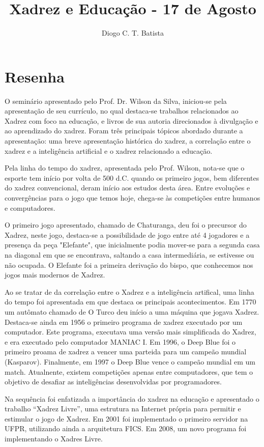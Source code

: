 \documentclass[12pt]{article}
\title{Xadrez e Educação - 17 de Agosto}
\author{Diogo C. T. Batista\inst{1}}
\begin{document}
\maketitle

\section{Resenha}

O seminário apresentado pelo Prof. Dr. Wilson da Silva, iniciou-se pela apresentação de seu currículo, no qual destaca-se trabalhos relacionados ao Xadrez com foco na educação, e livros de sua autoria direcionados à divulgação e ao aprendizado do xadrez. Foram três principais tópicos abordado durante a apresentação: uma breve apresentação histórica do xadrez, a correlação entre o xadrez e a inteligência artificial e o xadrez relacionado a educação.

Pela linha do tempo do xadrez, apresentada pelo Prof. Wilson, nota-se que o esporte tem início por volta de 500 d.C. quando os primeiro jogos, bem diferentes do xadrez convencional, deram início aos estudos desta área. Entre evoluções e convergências para o jogo que temos hoje, chega-se às competições entre humanos e computadores.

O primeiro jogo apresentado, chamado de Chaturanga, deu foi o precursor do Xadrez, neste jogo, destaca-se a possibilidade de jogo entre até 4 jogadores e a presença da peça "Elefante", que inicialmente podia mover-se para a segunda casa na diagonal em que se encontrava, saltando a casa intermediária, se estivesse ou não ocupada. O Elefante foi a primeira derivação do bispo, que conhecemos nos jogos mais modernos de Xadrez.

Ao se tratar de da correlação entre o Xadrez e a inteligência artifical, uma linha do tempo foi apresentada em que destaca os principais acontecimentos. Em 1770 um autômato chamado de O Turco deu início a uma máquina que jogava Xadrez. Destaca-se ainda em 1956 o primeiro programa de xadrez executado por um computador. Este programa, executava uma versão mais simplificada do Xadrez, e era executado pelo computador MANIAC I. Em 1996, o Deep Blue foi o primeiro proama de xadrez a vencer uma parteida para um campeão mundial (Kasparov). Finalmente, em 1997 o Deep Blue vence o campeão mundial em um match. Atualnente, existem competições apenas entre computadores, que tem o objetivo de desafiar as inteligências desenvolvidas por programadores.

Na sequência foi enfatizada a importância do xadrez na educação e apresentado o trabalho ``Xadrez Livre'', uma estrutura na Internet própria para permitir e estimular o jogo de Xadrez. Em 2001 foi implementado o primeiro servidor na UFPR, utilizando ainda a arquitetura FICS. Em 2008, um novo programa foi implementando o Xadres Livre.
\end{document}
